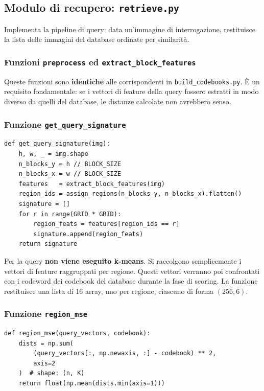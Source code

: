 \documentclass[12pt, a4paper]{article}
\begin{document}
\subsection{Modulo di recupero: \texttt{retrieve.py}}

Implementa la pipeline di query: data un'immagine di interrogazione, restituisce la lista
delle immagini del database ordinate per similarità.

\subsubsection{Funzioni \texttt{preprocess} ed \texttt{extract\_block\_features}}

Queste funzioni sono \textbf{identiche} alle corrispondenti in \texttt{build\_codebooks.py}.
È un requisito fondamentale: se i vettori di feature della query fossero estratti in modo
diverso da quelli del database, le distanze calcolate non avrebbero senso.

\subsubsection{Funzione \texttt{get\_query\_signature}}

\begin{lstlisting}[caption={Funzione \texttt{get\_query\_signature}}]
def get_query_signature(img):
    h, w, _ = img.shape
    n_blocks_y = h // BLOCK_SIZE
    n_blocks_x = w // BLOCK_SIZE
    features   = extract_block_features(img)
    region_ids = assign_regions(n_blocks_y, n_blocks_x).flatten()
    signature = []
    for r in range(GRID * GRID):
        region_feats = features[region_ids == r]
        signature.append(region_feats)
    return signature
\end{lstlisting}

Per la query \textbf{non viene eseguito k-means}. Si raccolgono semplicemente i vettori di
feature raggruppati per regione. Questi vettori verranno poi confrontati con i codeword dei
codebook del database durante la fase di scoring. La funzione restituisce una lista di 16
array, uno per regione, ciascuno di forma $(256, 6)$.

\subsubsection{Funzione \texttt{region\_mse}}

\begin{lstlisting}[caption={Funzione \texttt{region\_mse} (Flat VQ) con broadcasting NumPy}]
def region_mse(query_vectors, codebook):
    dists = np.sum(
        (query_vectors[:, np.newaxis, :] - codebook) ** 2,
        axis=2
    )  # shape: (n, K)
    return float(np.mean(dists.min(axis=1)))
\end{lstlisting}
\end{document}
